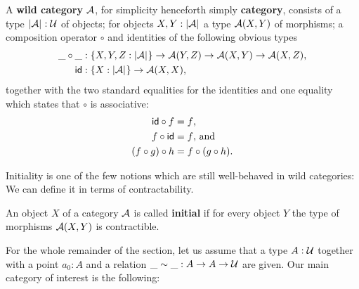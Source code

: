 \begin{defn}
A \textbf{wild category} $\mathcal A$, for simplicity henceforth simply
\textbf{category}, consists of a type $\mathopen{}\left|\mathcal A\right|_{}^{}\mathclose{} : \mathcal{U}$ of objects; for
objects $X, Y : \mathopen{}\left|\mathcal A\right|_{}^{}\mathclose{}$ a type $\mathcal A(X, Y)$ of morphisms;
a composition operator $\circ$ and identities of the following obvious types
\begin{align*}
\_\circ\_ &: \{X, Y, Z : \mathopen{}\left|\mathcal A\right|_{}^{}\mathclose{}\} \to \mathcal A(Y, Z) \to \mathcal A(X, Y) \to \mathcal A(X, Z) \text{,} \\
\mathsf{id} &: \{X : \mathopen{}\left|\mathcal A\right|_{}^{}\mathclose{}\} \to \mathcal A(X, X) \text{,}
\end{align*}
together with the two standard equalities for the identities and
one equality which states that $\circ$ is associative:
\begin{align*}
\mathsf{id} \circ f &= f \text{,}\\
f \circ \mathsf{id} &= f \text{, and}\\
(f \circ g) \circ h &= f \circ (g \circ h) \text{.}
\end{align*}
\end{defn}

Initiality is one of the few notions which are still well-behaved
in wild categories:
We can define it in terms of contractability.
\begin{defn}[Initiality]
An object $X$ of a category $\mathcal A$ is called \textbf{initial} if for every
object $Y$ the type of morphisms $\mathcal A(X, Y)$ is contractible.
\end{defn}

For the whole remainder of the section, let us assume that a type $A : \mathcal{U}$
together with a point $a_0 : A$ and a relation $\_\sim\_ : A \to A \to \mathcal{U}$ are
given.
Our main category of interest is the following:

